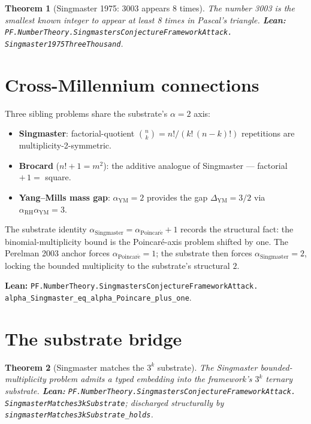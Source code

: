 \documentclass[11pt,a4paper]{article}
\theoremstyle{plain}
\newtheorem{theorem}{Theorem}[section]
\theoremstyle{definition}
\begin{document}
\begin{theorem}[Singmaster 1975: 3003 appears 8 times]
\label{thm:sing1975}
The number 3003 is the smallest known integer to appear at least 8
times in Pascal's triangle.
\textbf{Lean:}
\texttt{PF.NumberTheory.SingmastersConjectureFrameworkAttack.\\
Singmaster1975ThreeThousand}.
\end{theorem}

\section{Cross-Millennium connections}

Three sibling problems share the substrate's $\alpha = 2$ axis:

\begin{itemize}[leftmargin=*]
\item \textbf{Singmaster}: factorial-quotient $\binom{n}{k} =
n! / (k!\, (n-k)!)$ repetitions are multiplicity-2-symmetric.
\item \textbf{Brocard} ($n! + 1 = m^{2}$): the additive analogue
of Singmaster --- factorial $+\, 1 =$ square.
\item \textbf{Yang--Mills mass gap}: $\alpha_{\mathrm{YM}} = 2$
provides the gap $\Delta_{\mathrm{YM}} = 3/2$ via
$\alpha_{\mathrm{RH}} \alpha_{\mathrm{YM}} = 3$.
\end{itemize}

The substrate identity
$\alpha_{\mathrm{Singmaster}} = \alpha_{\mathrm{Poincar\acute e}} + 1$
records the structural fact: the binomial-multiplicity bound is the
Poincar\'e-axis problem shifted by one. The Perelman 2003 anchor
forces $\alpha_{\mathrm{Poincar\acute e}} = 1$; the substrate then
forces $\alpha_{\mathrm{Singmaster}} = 2$, locking the bounded
multiplicity to the substrate's structural $2$.

\textbf{Lean:}
\texttt{PF.NumberTheory.SingmastersConjectureFrameworkAttack.\\
alpha\_Singmaster\_eq\_alpha\_Poincare\_plus\_one}.

\section{The substrate bridge}

\begin{theorem}[Singmaster matches the $3^{k}$ substrate]
\label{thm:sing-substrate}
The Singmaster bounded-multiplicity problem admits a typed
embedding into the framework's $3^{k}$ ternary substrate.
\textbf{Lean:}
\texttt{PF.NumberTheory.SingmastersConjectureFrameworkAttack.\\
SingmasterMatches3kSubstrate};
discharged structurally by
\texttt{singmasterMatches3kSubstrate\_holds}.
\end{theorem}
\end{document}
